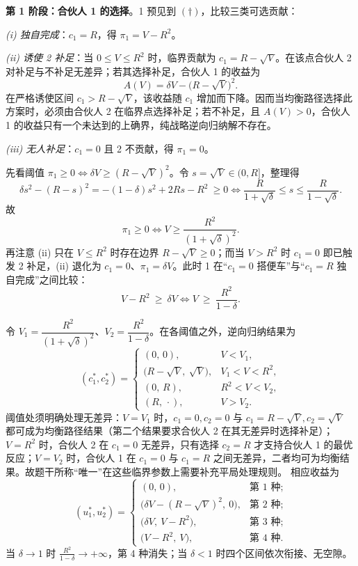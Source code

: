 \textbf{第 1 阶段：合伙人 1 的选择}。1 预见到 $(\dagger)$，比较三类可选贡献：

\emph{(i) 独自完成}：$c_1=R$，得 $\pi_1=V-R^2$。

\emph{(ii) 诱使 2 补足}：当 $0\le V\le R^2$ 时，临界贡献为 $c_1=R-\sqrt V$。在该点合伙人 2 对补足与不补足无差异；若其选择补足，合伙人 1 的收益为
\[
A(V)=\delta V-\bigl(R-\sqrt V\bigr)^2.
\]\indent
在严格诱使区间 $c_1>R-\sqrt V$，该收益随 $c_1$ 增加而下降。因而当均衡路径选择此方案时，必须由合伙人 2 在临界点选择补足；若不补足，且 $A(V)>0$，合伙人 1 的收益只有一个未达到的上确界，纯战略逆向归纳解不存在。

\emph{(iii) 无人补足}：$c_1=0$ 且 2 不贡献，得 $\pi_1=0$。

先看阈值 $\pi_1\ge0\iff\delta V\ge(R-\sqrt V)^2$。令 $s=\sqrt V\in(0,R]$，整理得
\[
\delta s^2-(R-s)^2=-(1-\delta)s^2+2Rs-R^2\ \ge 0
\iff \frac{R}{1+\sqrt\delta}\le s\le\frac{R}{1-\sqrt\delta}.
\]\indent
故
\[
\pi_1\ge 0\iff V\ge\frac{R^2}{(1+\sqrt\delta)^2}.
\tag{$\ddagger$}
\]\indent
再注意 (ii) 只在 $V\le R^2$ 时存在边界 $R-\sqrt V\ge0$；而当 $V>R^2$ 时 $c_1=0$ 即已触发 2 补足，(ii) 退化为 $c_1=0$、$\pi_1=\delta V$。此时 1 在“$c_1=0$ 搭便车”与“$c_1=R$ 独自完成”之间比较：
\[
V-R^2\ \ge\ \delta V\iff V\ \ge\ \frac{R^2}{1-\delta}.
\]

令 $V_1=\dfrac{R^2}{(1+\sqrt\delta)^2}$、$V_2=\dfrac{R^2}{1-\delta}$。在各阈值之外，逆向归纳结果为
\[
(c_1^*,c_2^*)=
\begin{cases}
(0,\,0), & V<V_1,\\[5pt]
\bigl(R-\sqrt V,\ \sqrt V\bigr), & V_1<V<R^2,\\[5pt]
(0,\,R), & R^2<V<V_2,\\[5pt]
(R,\,\cdot), & V>V_2.
\end{cases}
\]\indent
阈值处须明确处理无差异：$V=V_1$ 时，$c_1=0,c_2=0$ 与 $c_1=R-\sqrt V,c_2=\sqrt V$ 都可成为均衡路径结果（第二个结果要求合伙人 2 在其无差异时选择补足）；$V=R^2$ 时，合伙人 2 在 $c_1=0$ 无差异，只有选择 $c_2=R$ 才支持合伙人 1 的最优反应；$V=V_2$ 时，合伙人 1 在 $c_1=0$ 与 $c_1=R$ 之间无差异，二者均可为均衡结果。故题干所称“唯一”在这些临界参数上需要补充平局处理规则。
相应收益为
\[
(u_1^*,u_2^*)=
\begin{cases}
(0,\,0), & \text{第 1 种};\\
\bigl(\delta V-(R-\sqrt V)^2,\ 0\bigr), & \text{第 2 种};\\
\bigl(\delta V,\ V-R^2\bigr), & \text{第 3 种};\\
\bigl(V-R^2,\ V\bigr), & \text{第 4 种}.
\end{cases}
\]\indent
当 $\delta\to1$ 时 $\frac{R^2}{1-\delta}\to+\infty$，第 4 种消失；当 $\delta<1$ 时四个区间依次衔接、无空隙。

